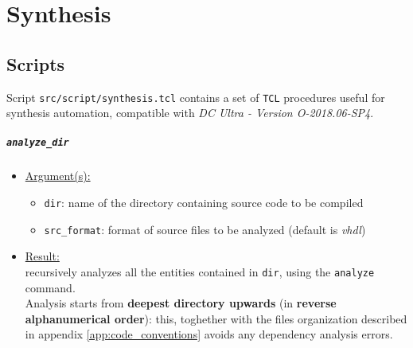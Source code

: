 \chapter{Synthesis}
\label{chap:synthesis}

\section{Scripts}
Script \texttt{src/script/synthesis.tcl} contains a set of \texttt{TCL}
procedures useful for synthesis automation, compatible with
\textit{DC Ultra - Version O-2018.06-SP4}.

\paragraph{\texttt{analyze\_dir}}
\begin{itemize}
	\item \underline{Argument(s):}
		\begin{itemize}
			\item \texttt{dir}: name of the directory containing
				source code to be compiled
			\item \texttt{src\_format}: format of source files
				to be analyzed (default is \textit{vhdl})
		\end{itemize}
	\item \underline{Result:} \\
		recursively analyzes all the entities contained in \texttt{dir},
		using the \texttt{analyze} command. \\
		Analysis starts from \textbf{deepest directory upwards} (in
		\textbf{reverse alphanumerical order}): this, toghether with the
		files organization described in appendix
		\ref{app:code_conventions} avoids any dependency analysis errors.
\end{itemize}

